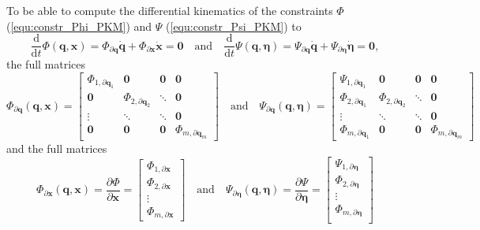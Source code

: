 \documentclass[robotics,article,accept,moreauthors,pdftex]{Definitions/mdpi}
\newcommand{\bm}[1]{\boldsymbol{#1}}
\let\Phi\varPhi
\let\Psi\varPsi
\begin{document}
To be able to compute the differential kinematics of the constraints $\bm{\Phi}$ (\ref{equ:constr_Phi_PKM}) and $\bm{\Psi}$ (\ref{equ:constr_Psi_PKM}) to
%
\begin{equation}
\frac{\mathrm{d}}{{\mathrm{d}}t} \bm{\Phi}(\bm{q},\bm{x})
=
\bm{\Phi}_{\partial \bm{q}} \dot{\bm{q}}
+
\bm{\Phi}_{\partial \bm{x}} \dot{\bm{x}}
=
\bm{0}
\quad
\mathrm{and}
\quad
\frac{\mathrm{d}}{{\mathrm{d}}t} \bm{\Psi}(\bm{q},\bm{\eta})
=
\bm{\Psi}_{\partial \bm{q}} \dot{\bm{q}}
+
\bm{\Psi}_{\partial \bm{\eta}} \dot{\bm{\eta}}
=
\bm{0},
\label{equ:constr_diff}
\end{equation}
%
the full   matrices 
%
\begin{equation}
\bm{\Phi}_{\partial \bm{q}}(\bm{q},\bm{x})
=
\begin{bmatrix}
\bm{\Phi}_{1,\partial\bm{q}_1} & \bm{0} & \bm{0} & \bm{0}\\
\bm{0} & \bm{\Phi}_{2,\partial\bm{q}_2} & \ddots & \bm{0} \\
\vdots & \ddots & \ddots & \bm{0} \\
\bm{0} & \bm{0} & \bm{0} &\bm{\Phi}_{m,\partial\bm{q}_m}
\end{bmatrix}
\quad
\mathrm{and}
\quad
\bm{\Psi}_{\partial \bm{q}}(\bm{q},\bm{\eta})
=
\begin{bmatrix}
\bm{\Psi}_{1,\partial\bm{q}_1} & \bm{0} & \bm{0} & \bm{0}\\
\bm{\Phi}_{2,\partial\bm{q}_1} & \bm{\Phi}_{2,\partial\bm{q}_2} & \ddots & \bm{0} \\
\vdots & \ddots & \ddots & \bm{0} \\
\bm{\Phi}_{m,\partial\bm{q}_1} & \bm{0} & \bm{0} &\bm{\Phi}_{m,\partial\bm{q}_m}
\end{bmatrix}
\label{equ:PhiPsi_grad_q_complete}
\end{equation}
%
and the full  matrices 
%
\begin{equation}
\bm{\Phi}_{\partial \bm{x}}(\bm{q},\bm{x})
=
\frac{\partial \bm{\Phi}}{\partial \bm{x}}
=
\begin{bmatrix}
\bm{\Phi}_{1,\partial\bm{x}} \\
\bm{\Phi}_{2,\partial\bm{x}} \\
\vdots \\
\bm{\Phi}_{m,\partial\bm{x}}
\end{bmatrix}
\quad
\mathrm{and}
\quad
\bm{\Psi}_{\partial \bm{\eta}}(\bm{q},\bm{\eta})
=
\frac{\partial \bm{\Psi}}{\partial \bm{\eta}}
=
\begin{bmatrix}
\bm{\Psi}_{1,\partial\bm{\eta}} \\
\bm{\Phi}_{2,\partial\bm{\eta}} \\
\vdots \\
\bm{\Phi}_{m,\partial\bm{\eta}} \\
\end{bmatrix}
\label{equ:PhiPsi_grad_x_complete}
\end{equation}
\end{document}
